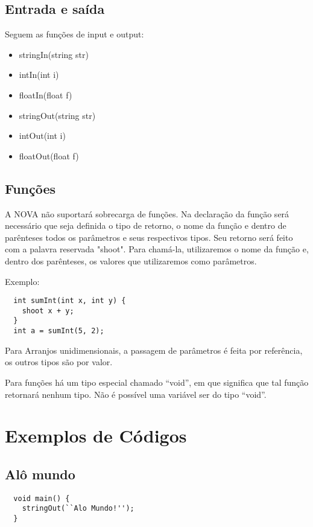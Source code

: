 \documentclass[a4paper, 12pt, article]{memoir}
\begin{document}
\subsection{Entrada e saída}
\label{subsec:io}
Seguem as funções de input e output:

\begin{itemize}
\item stringIn(string str)
\item intIn(int i)
\item floatIn(float f)
\item stringOut(string str)
\item intOut(int i)
\item floatOut(float f)
\end{itemize}

\subsection{Funções}
\label{subsec:function}
A NOVA não suportará sobrecarga de funções. Na declaração da função será necessário que seja definida o tipo de retorno, o nome da função e dentro de parênteses todos os parâmetros e seus respectivos tipos. Seu retorno será feito com a palavra reservada "shoot". Para chamá-la, utilizaremos o nome da função e, dentro dos parênteses, os valores que utilizaremos como parâmetros.

Exemplo:
\begin{lstlisting}
  int sumInt(int x, int y) {
    shoot x + y;
  }
  int a = sumInt(5, 2);
\end{lstlisting}

Para Arranjos unidimensionais, a passagem de parâmetros é feita por referência,
os outros tipos são por valor.

Para funções há um tipo especial chamado ``void'', em que significa que tal
função retornará nenhum tipo. Não é possível uma variável ser do tipo ``void''.
\section{Exemplos de Códigos}
\label{sec:code}

\subsection{Alô mundo}
\label{subsec:helloworld}
\begin{lstlisting}
  void main() {
    stringOut(``Alo Mundo!'');
  }
\end{lstlisting}
\end{document}
